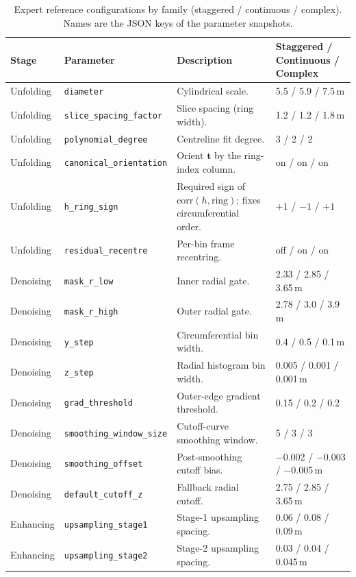 \documentclass[a4paper,fleqn]{cas-dc}
\begin{document}
\begin{table}[t]
\caption{Expert reference configurations by family (staggered / continuous / complex). Names are the JSON keys of the parameter snapshots.}\label{tab:anchor-params}
\footnotesize
\setlength{\tabcolsep}{3pt}
\begin{tabular*}{\textwidth}{@{\extracolsep{\fill}} l l L{0.30\textwidth} l @{}}
\toprule
Stage & Parameter & Description & Staggered / Continuous / Complex \\
\midrule
Unfolding & \texttt{diameter} & Cylindrical scale. & 5.5 / 5.9 / 7.5\,m \\
Unfolding & \texttt{slice\_spacing\_factor} & Slice spacing (ring width). & 1.2 / 1.2 / 1.8\,m \\
Unfolding & \texttt{polynomial\_degree} & Centreline fit degree. & 3 / 2 / 2 \\
Unfolding & \texttt{canonical\_orientation} & Orient $\mathbf t$ by the ring-index column. & on / on / on \\
Unfolding & \texttt{h\_ring\_sign} & Required sign of $\mathrm{corr}(h,\text{ring})$; fixes circumferential order. & $+1$ / $-1$ / $+1$ \\
Unfolding & \texttt{residual\_recentre} & Per-bin frame recentring. & off / on / on \\
\midrule
Denoising & \texttt{mask\_r\_low} & Inner radial gate. & 2.33 / 2.85 / 3.65\,m \\
Denoising & \texttt{mask\_r\_high} & Outer radial gate. & 2.78 / 3.0 / 3.9\,m \\
Denoising & \texttt{y\_step} & Circumferential bin width. & 0.4 / 0.5 / 0.1\,m \\
Denoising & \texttt{z\_step} & Radial histogram bin width. & 0.005 / 0.001 / 0.001\,m \\
Denoising & \texttt{grad\_threshold} & Outer-edge gradient threshold. & 0.15 / 0.2 / 0.2 \\
Denoising & \texttt{smoothing\_window\_size} & Cutoff-curve smoothing window. & 5 / 3 / 3 \\
Denoising & \texttt{smoothing\_offset} & Post-smoothing cutoff bias. & $-$0.002 / $-$0.003 / $-$0.005\,m \\
Denoising & \texttt{default\_cutoff\_z} & Fallback radial cutoff. & 2.75 / 2.85 / 3.65\,m \\
\midrule
Enhancing & \texttt{upsampling\_stage1} & Stage-1 upsampling spacing. & 0.06 / 0.08 / 0.09\,m \\
Enhancing & \texttt{upsampling\_stage2} & Stage-2 upsampling spacing. & 0.03 / 0.04 / 0.045\,m \\

\end{tabular*}
\end{table}
\end{document}
